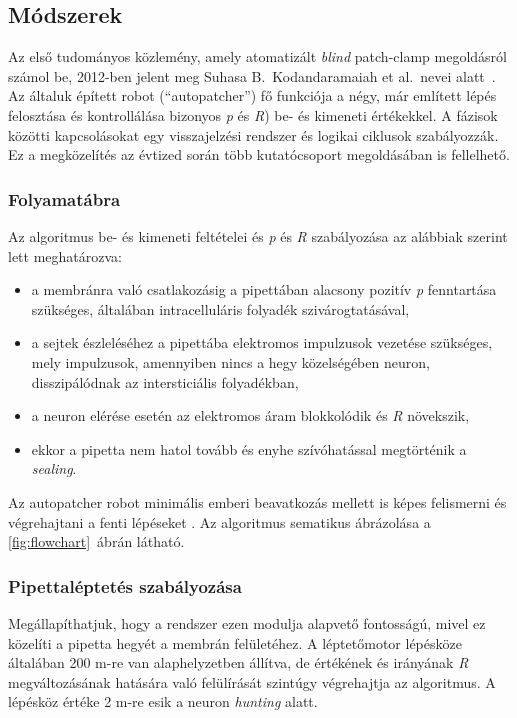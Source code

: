 \documentclass[12pt,a4paper]{report}
\begin{document}
\subsection*{Módszerek}
Az első tudományos közlemény, amely atomatizált \textit{blind} patch-clamp megoldásról számol be, 2012-ben jelent meg Suhasa B.\ Kodandaramaiah et al.\ nevei alatt~\cite{kodandaramaiah2012}. Az általuk épített robot (\enquote{autopatcher}) fő funkciója a négy, már említett lépés felosztása és kontrollálása bizonyos \textit{p} és \textit{R}) be- és kimeneti értékekkel. A fázisok közötti kapcsolásokat egy visszajelzési rendszer és logikai ciklusok szabályozzák. Ez a megközelítés az évtized során több kutatócsoport megoldásában is fellelhető.

\subsubsection*{Folyamatábra}
Az algoritmus be- és kimeneti feltételei és \textit{p} és \textit{R} szabályozása az alábbiak szerint lett meghatározva:
\begin{itemize}
    \item a membránra való csatlakozásig a pipettában alacsony pozitív \textit{p} fenntartása szükséges, általában intracelluláris folyadék szivárogtatásával,
    \item a sejtek észleléséhez a pipettába elektromos impulzusok vezetése szükséges, mely impulzusok, amennyiben nincs a hegy közelségében neuron, disszipálódnak az intersticiális folyadékban,
    \item a neuron elérése esetén az elektromos áram blokkolódik és \textit{R} növekszik,
    \item ekkor a pipetta nem hatol tovább és enyhe szívóhatással megtörténik a \textit{sealing}.
\end{itemize}
Az autopatcher robot minimális emberi beavatkozás mellett is képes felismerni és végrehajtani a fenti lépéseket . Az algoritmus sematikus ábrázolása a \ref{fig:flowchart}~ábrán látható.

\subsubsection*{Pipettaléptetés szabályozása}
Megállapíthatjuk, hogy a rendszer ezen modulja alapvető fontosságú, mivel ez közelíti a pipetta hegyét a membrán felületéhez. A léptetőmotor lépésköze általában 200 \textmu m-re van alaphelyzetben állítva, de értékének és irányának \textit{R} megváltozásának hatására való felülírását szintúgy végrehajtja az algoritmus. A lépésköz értéke 2 \textmu m-re esik a neuron \textit{hunting} alatt.
\end{document}

